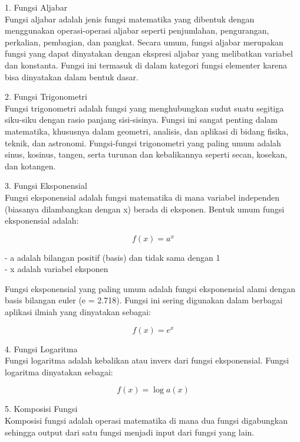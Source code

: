 \documentclass[a4paper,10pt]{article}
\begin{document}
\begin{eulernotebook}
\begin{eulercomment}
\begin{eulercomment}
\begin{eulercomment}
\end{eulercomment}
\begin{eulercomment}
1. Fungsi Aljabar\\
Fungsi aljabar adalah jenis fungsi matematika yang dibentuk dengan
menggunakan operasi-operasi aljabar seperti penjumlahan, pengurangan,
perkalian, pembagian, dan pangkat. Secara umum, fungsi aljabar
merupakan fungsi yang dapat dinyatakan dengan ekspresi aljabar yang
melibatkan variabel dan konstanta. Fungsi ini termasuk di dalam
kategori fungsi elementer karena bisa dinyatakan dalam bentuk dasar.

2. Fungsi Trigonometri\\
Fungsi trigonometri adalah fungsi yang menghubungkan sudut suatu
segitiga siku-siku dengan rasio panjang sisi-sisinya. Fungsi ini
sangat penting dalam matematika, khususnya dalam geometri, analisis,
dan aplikasi di bidang fisika, teknik, dan astronomi. Fungsi-fungsi
trigonometri yang paling umum adalah sinus, kosinus, tangen, serta
turunan dan kebalikannya seperti secan, kosekan, dan kotangen.

3. Fungsi Eksponensial\\
Fungsi eksponensial adalah fungsi matematika di mana variabel
independen (biasanya dilambangkan dengan x) berada di eksponen. Bentuk
umum fungsi eksponensial adalah:

\end{eulercomment}
\begin{eulerformula}
\[
f(x)=a^x
\]
\end{eulerformula}
\begin{eulercomment}
- a adalah bilangan positif (basis) dan tidak sama dengan 1\\
- x adalah variabel eksponen

Fungsi eksponensial yang paling umum adalah fungsi eksponensial alami
dengan basis bilangan euler (e = 2.718). Fungsi ini sering digunakan
dalam berbagai aplikasi ilmiah yang dinyatakan sebagai:

\end{eulercomment}
\begin{eulerformula}
\[
f(x)=e^x
\]
\end{eulerformula}
\begin{eulercomment}
4. Fungsi Logaritma\\
Fungsi logaritma adalah kebalikan atau invers dari fungsi
eksponensial. Fungsi logaritma dinyatakan sebagai:

\end{eulercomment}
\begin{eulerformula}
\[
f(x)= \log a(x)
\]
\end{eulerformula}
\begin{eulercomment}
5. Komposisi Fungsi\\
Komposisi fungsi adalah operasi matematika di mana dua fungsi
digabungkan sehingga output dari satu fungsi menjadi input dari fungsi
yang lain.


\end{eulercomment}
\end{eulercomment}
\end{eulercomment}
\end{eulernotebook}
\end{document}
